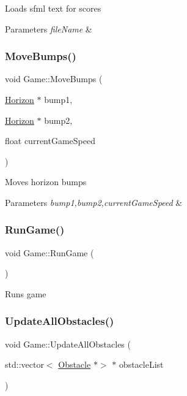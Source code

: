 Loads sfml text for scores 
\begin{DoxyParams}{Parameters}
{\em file\+Name} & \\
\hline
\end{DoxyParams}
\mbox{\label{class_game_a8ce652bb4568b3306301bbfe72bd91e4}} 
\subsubsection{\texorpdfstring{Move\+Bumps()}{MoveBumps()}}
{\footnotesize\ttfamily void Game\+::\+Move\+Bumps (\begin{DoxyParamCaption}\item[{\mbox{\hyperlink{class_horizon}{Horizon}} $\ast$}]{bump1,  }\item[{\mbox{\hyperlink{class_horizon}{Horizon}} $\ast$}]{bump2,  }\item[{float}]{current\+Game\+Speed }\end{DoxyParamCaption})}

Moves horizon bumps 
\begin{DoxyParams}{Parameters}
{\em bump1,bump2,current\+Game\+Speed} & \\
\hline
\end{DoxyParams}
\mbox{\label{class_game_aa7f79908f4a73b4affe1f7143fbe8fe1}} 
\subsubsection{\texorpdfstring{Run\+Game()}{RunGame()}}
{\footnotesize\ttfamily void Game\+::\+Run\+Game (\begin{DoxyParamCaption}{ }\end{DoxyParamCaption})}

Runs game \mbox{\label{class_game_a347a4d559fbd7c69f99451ebb084f5c4}} 
\subsubsection{\texorpdfstring{Update\+All\+Obstacles()}{UpdateAllObstacles()}}
{\footnotesize\ttfamily void Game\+::\+Update\+All\+Obstacles (\begin{DoxyParamCaption}\item[{std\+::vector$<$ \mbox{\hyperlink{class_obstacle}{Obstacle}} $\ast$$>$ $\ast$}]{obstacle\+List }\end{DoxyParamCaption})}

